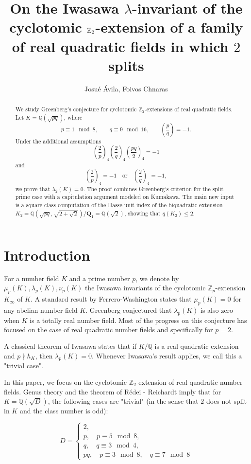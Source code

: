 \documentclass{article}
\title{On the Iwasawa $\lambda$-invariant of the cyclotomic $\Z_2$-extension of a family of real quadratic fields in which $2$ splits  }
\date{}
\author{Josu\'e \'Avila, Foivos Chnaras}
\numberwithin{equation}{section}
\theoremstyle{plain}  %
\theoremstyle{definition}
\newcommand{\Z}{\mathbb{Z}}
\newcommand{\Q}{\mathbb{Q}}
\newcommand{\Redei}{R\'edei }
\begin{document}
\maketitle 

\begin{abstract}
We study Greenberg's conjecture for cyclotomic $\Z_2$-extensions of
real quadratic fields. Let $K=\mathbb Q(\sqrt{pq})$, where
$$
p\equiv 1 \mod 8,\qquad q\equiv 9 \mod {16},\qquad
\left(\frac{p}{q}\right)=-1.
$$
Under the additional assumptions
$$
\left(\frac{2}{p}\right)_4
\left(\frac{2}{q}\right)_4
\left(\frac{pq}{2}\right)_4=-1
$$
and
$$
\left(\frac{2}{p}\right)_4=-1
\quad\text{or}\quad
\left(\frac{2}{q}\right)_4=-1,
$$
we prove that $\lambda_2(K)=0$. The proof combines Greenberg's criterion
for the split prime case with a capitulation argument modeled on Kumakawa.
The main new input is a square-class computation of the Hasse unit index of
the biquadratic extension $K_2=\Q(\sqrt{pq}, \sqrt{2+\sqrt{2}})/\mathbf Q_1=\Q(\sqrt{2})$, showing that $q(K_2)\le 2$. 
\end{abstract}

\section{Introduction}
For a number field $K$ and a prime number $p$, we denote by $\mu_p(K), \lambda_p(K), \nu_p(K)$ the Iwasawa invariants of the cyclotomic $\Z_p$-extension $K_\infty$ of $K$. A standard result by Ferrero-Washington \cite{MR528968} states that $\mu_p(K)=0$ for any abelian number field $K$. Greenberg \cite{MR401702} conjectured that $\lambda_p(K)$ is also zero when $K$ is a totally real number field. Most of the progress on this conjecture has focused on the case of real quadratic number fields and specifically for $p=2$.

A classical theorem of Iwasawa states that if $K/\Q$ is a real quadratic extension and $p\nmid h_K$, then $\lambda_p(K)=0$. Whenever Iwasawa's result applies, we call this a "trivial case".

In this paper, we focus on the cyclotomic $\Z_2$-extension of real quadratic number fields. 
Genus theory and the theorem of \Redei- Reichardt imply that for $K=\Q(\sqrt{D})$, the following cases are "trivial" (in the sense that $2$ does not split in $K$ and the class number is odd): 

$$D=\begin{cases}
    2,\\ 
    p, \quad p \equiv 5 \mod 8, \\ 
    q, \quad q\equiv 3 \mod 4, \\ 
    pq, \quad p\equiv 3 \mod 8, \quad q\equiv 7 \mod 8
\end{cases}$$
\end{document}
